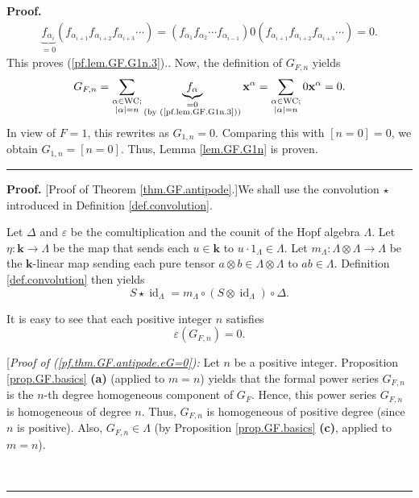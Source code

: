 \documentclass[numbers=enddot,12pt,final,onecolumn,notitlepage]{scrartcl}%
\theoremstyle{definition}
\newenvironment{proof}[1][Proof]{\noindent\textbf{#1.} }{\ \rule{0.5em}{0.5em}}
\let\sumnonlimits\sum
\renewcommand{\sum}{\sumnonlimits\limits}
\newenvironment{verlong}{}{}
\begin{document}
\begin{verlong}
\begin{proof}
{\begin{align*}
\underbrace{f_{\alpha_{i}}}_{=0}\left(  f_{\alpha_{i+1}}f_{\alpha_{i+2}%
}f_{\alpha_{i+3}}\cdots\right)  =\left(  f_{\alpha_{1}}f_{\alpha_{2}}\cdots
f_{\alpha_{i-1}}\right)  0\left(  f_{\alpha_{i+1}}f_{\alpha_{i+2}}%
f_{\alpha_{i+3}}\cdots\right)  =0.
\end{align*}
This proves (\ref{pf.lem.GF.G1n.3}).}. Now, the definition of $G_{F,n}$ yields%
\[
G_{F,n}=\sum_{\substack{\alpha\in\operatorname*{WC};\\\left\vert
\alpha\right\vert =n}}\underbrace{f_{\alpha}}_{\substack{=0\\\text{(by
(\ref{pf.lem.GF.G1n.3}))}}}\mathbf{x}^{\alpha}=\sum_{\substack{\alpha
\in\operatorname*{WC};\\\left\vert \alpha\right\vert =n}}0\mathbf{x}^{\alpha
}=0.
\]
In view of $F=1$, this rewrites as $G_{1,n}=0$. Comparing this with $\left[
n=0\right]  =0$, we obtain $G_{1,n}=\left[  n=0\right]  $. Thus, Lemma
\ref{lem.GF.G1n} is proven.
\end{proof}

\begin{proof}
[Proof of Theorem \ref{thm.GF.antipode}.]We shall use the convolution $\star$
introduced in Definition \ref{def.convolution}.

Let $\Delta$ and $\varepsilon$ be the comultiplication and the counit of the
Hopf algebra $\Lambda$. Let $\eta:\mathbf{k}\rightarrow\Lambda$ be the map
that sends each $u\in\mathbf{k}$ to $u\cdot1_{\Lambda}\in\Lambda$. Let
$m_{\Lambda}:\Lambda\otimes\Lambda\rightarrow\Lambda$ be the $\mathbf{k}%
$-linear map sending each pure tensor $a\otimes b\in\Lambda\otimes\Lambda$ to
$ab\in\Lambda$. Definition \ref{def.convolution} then yields
\begin{equation}
S\star\operatorname*{id}\nolimits_{\Lambda}=m_{\Lambda}\circ\left(
S\otimes\operatorname*{id}\nolimits_{\Lambda}\right)  \circ\Delta.
\label{pf.thm.GF.antipode.Sid1}%
\end{equation}


It is easy to see that each positive integer $n$ satisfies%
\begin{equation}
\varepsilon\left(  G_{F,n}\right)  =0. \label{pf.thm.GF.antipode.eG=0}%
\end{equation}


[\textit{Proof of (\ref{pf.thm.GF.antipode.eG=0}):} Let $n$ be a positive
integer. Proposition \ref{prop.GF.basics} \textbf{(a)} (applied to $m=n$)
yields that the formal power series $G_{F,n}$ is the $n$-th degree homogeneous
component of $G_{F}$. Hence, this power series $G_{F,n}$ is homogeneous of
degree $n$. Thus, $G_{F,n}$ is homogeneous of positive degree (since $n$ is
positive). Also, $G_{F,n}\in\Lambda$ (by Proposition \ref{prop.GF.basics}
\textbf{(c)}, applied to $m=n$).


\end{proof}
\end{verlong}
\end{document}
